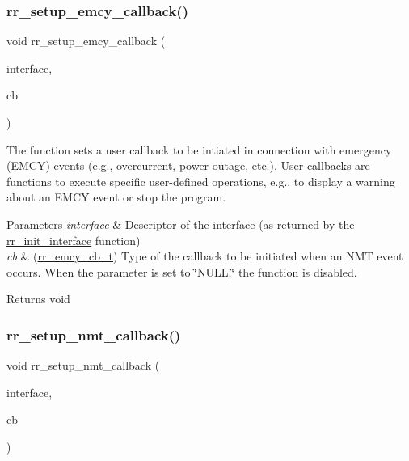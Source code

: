 \subsubsection{\texorpdfstring{rr\+\_\+setup\+\_\+emcy\+\_\+callback()}{rr\_setup\_emcy\_callback()}}
{\footnotesize\ttfamily void rr\+\_\+setup\+\_\+emcy\+\_\+callback (\begin{DoxyParamCaption}\item[{\hyperlink{structrr__can__interface__t}{rr\+\_\+can\+\_\+interface\+\_\+t} $\ast$}]{interface,  }\item[{\hyperlink{api_8h_a3850d8aa5bc177cb66b7638cafd30204}{rr\+\_\+emcy\+\_\+cb\+\_\+t}}]{cb }\end{DoxyParamCaption})}



The function sets a user callback to be intiated in connection with emergency (E\+M\+CY) events (e.\+g., overcurrent, power outage, etc.). User callbacks are functions to execute specific user-\/defined operations, e.\+g., to display a warning about an E\+M\+CY event or stop the program. 


\begin{DoxyParams}{Parameters}
{\em interface} & Descriptor of the interface (as returned by the \hyperlink{group___common_ga472a4890dcc7d7a13123c56a06946d91}{rr\+\_\+init\+\_\+interface} function) \\
\hline
{\em cb} & (\hyperlink{api_8h_a3850d8aa5bc177cb66b7638cafd30204}{rr\+\_\+emcy\+\_\+cb\+\_\+t}) Type of the callback to be initiated when an N\+MT event occurs. When the parameter is set to \char`\"{}\+N\+U\+L\+L,\char`\"{} the function is disabled. \\
\hline
\end{DoxyParams}
\begin{DoxyReturn}{Returns}
void 
\end{DoxyReturn}
\mbox{\label{group___utils_ga2433f49950ad40f06537287b52852c13}} 
\subsubsection{\texorpdfstring{rr\+\_\+setup\+\_\+nmt\+\_\+callback()}{rr\_setup\_nmt\_callback()}}
{\footnotesize\ttfamily void rr\+\_\+setup\+\_\+nmt\+\_\+callback (\begin{DoxyParamCaption}\item[{\hyperlink{structrr__can__interface__t}{rr\+\_\+can\+\_\+interface\+\_\+t} $\ast$}]{interface,  }\item[{\hyperlink{api_8h_ae0f9f2b200672126bb1f6eb3e66c27fc}{rr\+\_\+nmt\+\_\+cb\+\_\+t}}]{cb }\end{DoxyParamCaption})}



